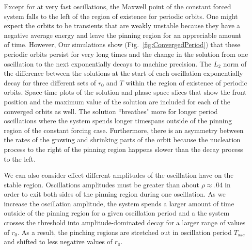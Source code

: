 \documentclass[../main/TimeForcingSHE.tex]{subfiles}
\begin{document}
Except for at very fast oscillations, the Maxwell point of the constant forced system falls to the left of the region of existence for periodic orbits.  One might expect the orbits to be transients that are weakly unstable because they have a negative average energy and leave the pinning region for an appreciable amount of time.  However, Our simulations show (Fig.~\ref{fig:ConvergedPeriod}) that these  periodic orbits persist for very long times and the change in the solution from one oscillation to the next exponentially decays to machine precision.   The $L_2$ norm of the difference between the solutions at the start of each oscillation exponentially decay for three different sets of $r_0$ and $T$ within the region of existence of periodic orbits.  Space-time plots of the solution and phase space slices that show the front position and the maximum value of the solution are included for each of the converged orbits as well. 
\FIGconvergedperiod
The solution ``breathes" more for longer period oscillations where the system spends longer timespans outside of the pinning region of the constant forcing case.   Furthermore, there is an asymmetry between the rates of the growing and shrinking parts of the orbit because the nucleation process to the right of the pinning region happens slower than the decay process to the left.   


 We can also consider effect  different amplitudes of the oscillation have on the stable region.   Oscillations amplitudes must be greater than about $\rho\approx .04$ in order to exit both sides of the pinning region during one oscillation.    As we increase the oscillation amplitude,  the system spends a larger amount of time outside of the pinning region for a given oscillation period and a the system crosses the threshold into amplitude-dominated decay for a larger range of values of $r_0$.  As a result, the  pinching regions are stretched out in oscillation period $T_{osc}$ and shifted to less negative values of $r_0$.    
\FIGvcmcompare
\end{document}
